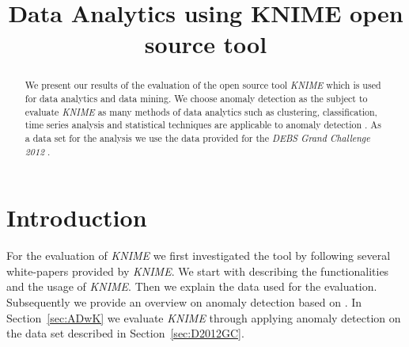 \documentclass{dima}
\begin{document}

\title{Data Analytics using {\ttlit KNIME} open source tool}



\author{
}

\maketitle


\begin{abstract}
We present our results of the evaluation of the open source tool \textit{KNIME} which is used for data analytics and data mining. We choose anomaly detection as the subject to evaluate \textit{KNIME} as many methods of data analytics such as clustering, classification, time series analysis and statistical techniques are applicable to anomaly detection \cite{Chandola:2009:ADS:1541880.1541882}. As a data set for the analysis we use the data provided for the \textit{DEBS Grand Challenge 2012} \cite{Jerzak:2012:DGC:2335484.2335536}.
\end{abstract}

\section{Introduction}
For the evaluation of \textit{KNIME} we first investigated the tool by following several white-papers provided by \textit{KNIME}. We start with describing the functionalities and the usage of \textit{KNIME}. Then we explain the data used for the evaluation. Subsequently we provide an overview on anomaly detection based on \cite{Chandola:2009:ADS:1541880.1541882}. In Section~\ref{sec:ADwK} we evaluate \textit{KNIME} through applying anomaly detection on the data set described in Section~\ref{sec:D2012GC}.
\end{document}
